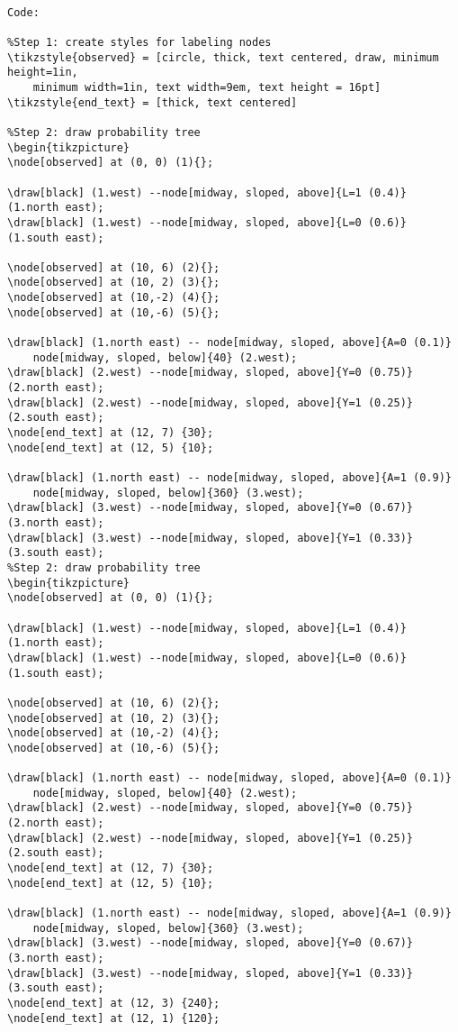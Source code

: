 \documentclass[a4paper]{report}
\begin{document}
\begin{framed}
\begin{Verbatim}

Code:

%Step 1: create styles for labeling nodes
\tikzstyle{observed} = [circle, thick, text centered, draw, minimum height=1in, 
	minimum width=1in, text width=9em, text height = 16pt]
\tikzstyle{end_text} = [thick, text centered]

%Step 2: draw probability tree 
\begin{tikzpicture}
\node[observed] at (0, 0) (1){};

\draw[black] (1.west) --node[midway, sloped, above]{L=1 (0.4)} (1.north east);
\draw[black] (1.west) --node[midway, sloped, above]{L=0 (0.6)} (1.south east);

\node[observed] at (10, 6) (2){};
\node[observed] at (10, 2) (3){};
\node[observed] at (10,-2) (4){};
\node[observed] at (10,-6) (5){};

\draw[black] (1.north east) -- node[midway, sloped, above]{A=0 (0.1)} 
	node[midway, sloped, below]{40} (2.west);
\draw[black] (2.west) --node[midway, sloped, above]{Y=0 (0.75)} (2.north east);
\draw[black] (2.west) --node[midway, sloped, above]{Y=1 (0.25)} (2.south east);
\node[end_text] at (12, 7) {30};
\node[end_text] at (12, 5) {10};

\draw[black] (1.north east) -- node[midway, sloped, above]{A=1 (0.9)} 
	node[midway, sloped, below]{360} (3.west);
\draw[black] (3.west) --node[midway, sloped, above]{Y=0 (0.67)} (3.north east);
\draw[black] (3.west) --node[midway, sloped, above]{Y=1 (0.33)} (3.south east);
%Step 2: draw probability tree 
\begin{tikzpicture}
\node[observed] at (0, 0) (1){};

\draw[black] (1.west) --node[midway, sloped, above]{L=1 (0.4)} (1.north east);
\draw[black] (1.west) --node[midway, sloped, above]{L=0 (0.6)} (1.south east);

\node[observed] at (10, 6) (2){};
\node[observed] at (10, 2) (3){};
\node[observed] at (10,-2) (4){};
\node[observed] at (10,-6) (5){};

\draw[black] (1.north east) -- node[midway, sloped, above]{A=0 (0.1)} 
	node[midway, sloped, below]{40} (2.west);
\draw[black] (2.west) --node[midway, sloped, above]{Y=0 (0.75)} (2.north east);
\draw[black] (2.west) --node[midway, sloped, above]{Y=1 (0.25)} (2.south east);
\node[end_text] at (12, 7) {30};
\node[end_text] at (12, 5) {10};

\draw[black] (1.north east) -- node[midway, sloped, above]{A=1 (0.9)} 
	node[midway, sloped, below]{360} (3.west);
\draw[black] (3.west) --node[midway, sloped, above]{Y=0 (0.67)} (3.north east);
\draw[black] (3.west) --node[midway, sloped, above]{Y=1 (0.33)} (3.south east);
\node[end_text] at (12, 3) {240};
\node[end_text] at (12, 1) {120};


\end{Verbatim}
\end{framed}
\end{document}
